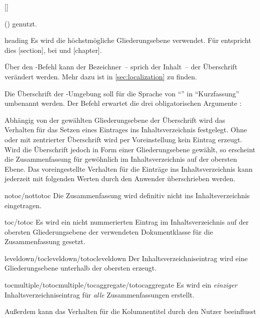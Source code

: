 \begin{Declaration}{[\PSet]}
\begin{values}
  () genutzt. 
\item[heading]
  Es wird die höchstmögliche Gliederungsebene verwendet. Für 
   entspricht dies [section], bei 
   und  [chapter].
\end{values}
%
Über den \KOMAScript-Befehl  kann der Bezeichner~-- 
sprich der Inhalt~-- der Überschrift verändert werden. Mehr dazu ist in 
\autoref{sec:localization} zu finden.
%
\begin{Example}
Die Überschrift der -Umgebung soll für die Sprache 
 von \enquote{\abstractname} in \enquote{Kurzfassung} umbenannt 
werden. Der Befehl  erwartet die drei obligatorischen 
Argumente :
\begin{Code}[escapechar=§]
\end{Code}
\end{Example}
%
Abhängig von der gewählten Gliederungsebene der Überschrift wird das Verhalten 
für das Setzen eines Eintrages ins Inhaltsverzeichnis festgelegt. Ohne oder mit 
zentrierter Überschrift wird per Voreinstellung kein Eintrag erzeugt. Wird die 
Überschrift jedoch in Form einer Gliederungsebene gewählt, so erscheint die 
Zusammenfassung für gewöhnlich im Inhaltsverzeichnis auf der obersten Ebene. 
Das voreingestellte Verhalten für die Einträge ins Inhaltsverzeichnis kann 
jederzeit mit folgenden Werten durch den Anwender überschrieben werden.
%
\begin{values}
\item[notoc/nottotoc]
  Die Zusammenfassung wird definitiv nicht ins Inhaltsverzeichnis eingetragen.
\item[toc/totoc]
  Es wird ein nicht nummerierten Eintrag im Inhaltsverzeichnis auf der obersten 
  Gliederungsebene der verwendeten Dokumentklasse für die Zusammenfassung 
  gesetzt.
\item[leveldown/tocleveldown/totocleveldown]
  Der Inhaltsverzeichniseintrag wird eine Gliederungsebene unterhalb der 
  obersten erzeugt.
\item[tocmultiple/totocmultiple/tocaggregate/totocaggregate]
  Es wird ein \emph{einziger} Inhaltsverzeichniseintrag für \emph{alle} 
  Zusammenfassungen erstellt.
\end{values}
%
Außerdem kann das Verhalten für die Kolumnentitel durch den Nutzer beeinflusst 

\end{Declaration}
